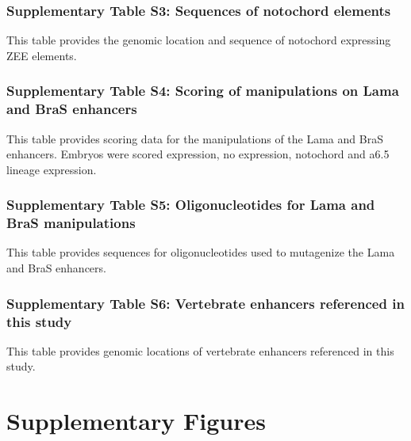 \subsubsection{Supplementary Table S3: Sequences of notochord elements}
This table provides the genomic location and sequence of notochord expressing ZEE elements.

\subsubsection{Supplementary Table S4: Scoring of manipulations on Lama and BraS enhancers}
This table provides scoring data for the manipulations of the Lama and BraS enhancers. Embryos were scored expression, no expression, notochord and a6.5 lineage expression.

\subsubsection{Supplementary Table S5: Oligonucleotides for Lama and BraS manipulations}
This table provides sequences for oligonucleotides used to mutagenize the Lama and BraS enhancers.

\subsubsection{Supplementary Table S6: Vertebrate enhancers referenced in this study}
This table provides genomic locations of vertebrate enhancers referenced in this study.

\section{Supplementary Figures}

